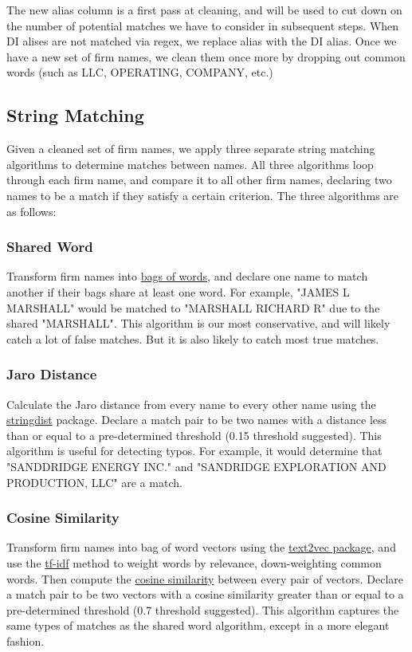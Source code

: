 \documentclass{article}
\begin{document}
The new alias column is a first pass at cleaning, and will be used to cut down on the number of potential matches we have to consider in subsequent steps. When DI alises are not matched via regex, we replace alias with the DI alias. Once we have a new set of firm names, we clean them once more by dropping out common words (such as LLC, OPERATING, COMPANY, etc.) 

\subsection{String Matching}

Given a cleaned set of firm names, we apply three separate string matching algorithms to determine matches between names. All three algorithms loop through each firm name, and compare it to all other firm names, declaring two names to be a match if they satisfy a certain criterion. The three algorithms are as follows:
\subsubsection{Shared Word}
Transform firm names into \href{https://en.wikipedia.org/wiki/Bag-of-words_model}{bags of words}, and declare one name to match another if their bags share at least one word. For example, "JAMES L MARSHALL" would be matched to "MARSHALL RICHARD R" due to the shared "MARSHALL". This algorithm is our most conservative, and will likely catch a lot of false matches. But it is also likely to catch most true matches.  
\subsubsection{Jaro Distance}
Calculate the Jaro distance from every name to every other name using the \href{https://cran.r-project.org/web/packages/stringdist/stringdist.pdf}{stringdist} package. Declare a match pair to be two names with a distance less than or equal to a pre-determined threshold (0.15 threshold suggested). This algorithm is useful for detecting typos. For example, it would determine that "SANDDRIDGE ENERGY INC." and "SANDRIDGE EXPLORATION AND PRODUCTION, LLC" are a match. 
\subsubsection{Cosine Similarity}
Transform firm names into bag of word vectors using the \href{http://text2vec.org/}{text2vec package}, and use the \href{https://en.wikipedia.org/wiki/Tf\%E2\%80\%93idf}{tf-idf} method to weight words by relevance, down-weighting common words. Then compute the \href{https://en.wikipedia.org/wiki/Cosine_similarity}{cosine similarity} between every pair of vectors. Declare a match pair to be two vectors with a cosine similarity greater than or equal to a pre-determined threshold (0.7 threshold suggested). This algorithm captures the same types of matches as the shared word algorithm, except in a more elegant fashion. \\
\end{document}
